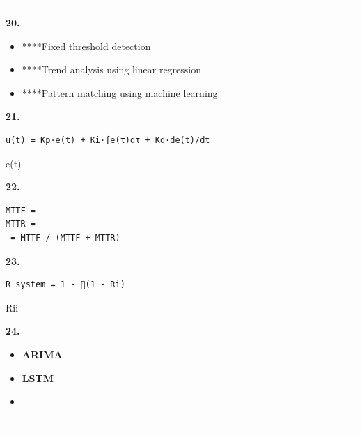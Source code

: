 \begin{center}\rule{0.5\linewidth}{0.5pt}\end{center}

\textbf{20. }

\begin{itemize}
\tightlist
\item
  ****Fixed threshold detection
\item
  ****Trend analysis using linear regression
\item
  ****Pattern matching using machine learning
\end{itemize}

\textbf{21. }

\begin{verbatim}
u(t) = Kp·e(t) + Ki·∫e(τ)dτ + Kd·de(t)/dt
\end{verbatim}

e(t)

\textbf{22. }

\begin{verbatim}
MTTF = 
MTTR = 
 = MTTF / (MTTF + MTTR)
\end{verbatim}

\textbf{23. }

\begin{verbatim}
R_system = 1 - ∏(1 - Ri)
\end{verbatim}

Rii

\textbf{24. }

\begin{itemize}
\item
  \textbf{ARIMA}
\item
  \textbf{LSTM}
\item
  \begin{center}\rule{0.5\linewidth}{0.5pt}\end{center}
\end{itemize}

\subsection{}\label{section-70}

\begin{center}\rule{0.5\linewidth}{0.5pt}\end{center}

